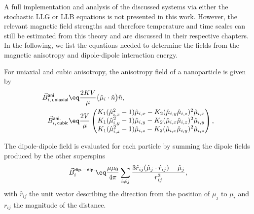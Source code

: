 \documentclass[\main/dresen_thesis.tex]{subfiles}
\begin{document}
      A full implementation and analysis of the discussed systems via either the stochastic LLG or LLB equations is not presented in this work.
      However, the relevant magnetic field strengths and therefore temperature and time scales can still be estimated from this theory and are discussed in their respective chapters.
      In the following, we list the equations needed to determine the fields from the magnetic anisotropy and dipole-dipole interaction energy.

      For uniaxial and cubic anisotropy, the anisotropy field of a nanoparticle is given by
      \begin{align}
        \vec{B}^\mathsf{ani.}_{i, \,\mathsf{uniaxial}} &\eq \frac{2 K V}{\mu} \bigl( \hat{\mu}_i \cdot \hat{n} \bigr) \hat{n},\\
        \vec{B}^\mathsf{ani.}_{i, \,\mathsf{cubic}} &\eq \frac{2 V}{\mu} \begin{pmatrix}
          K_1 (\hat{\mu}_{i, x}^2 - 1) \hat{\mu}_{i, x} - K_2 (\hat{\mu}_{i, y} \hat{\mu}_{i, z})^2 \hat{\mu}_{i, x} \\
          K_1 (\hat{\mu}_{i, y}^2 - 1) \hat{\mu}_{i, y} - K_2 (\hat{\mu}_{i, x} \hat{\mu}_{i, z})^2 \hat{\mu}_{i, y} \\
          K_1 (\hat{\mu}_{i, z}^2 - 1) \hat{\mu}_{i, z} - K_2 (\hat{\mu}_{i, x} \hat{\mu}_{i, y})^2 \hat{\mu}_{i, z}
        \end{pmatrix},
      \end{align}

      The dipole-dipole field is evaluated for each particle by summing the dipole fields produced by the other superspins
      \begin{align}
        \vec{B}^\mathsf{dip.-dip.}_i \eq \frac{\mu \mu_0}{4 \pi}  \sum_{i \neq j} \frac{3 \hat{r}_{ij}  (\hat{\mu}_j \cdot \hat{r}_{ij}) - \hat{\mu}_j}{r_{ij}^3},
      \end{align}
      with $\hat{r}_{ij}$ the unit vector describing the direction from the position of $\mu_j$ to $\mu_i$ and $r_{ij}$ the magnitude of the distance.
\end{document}
